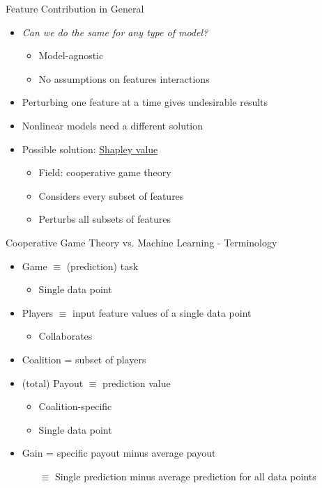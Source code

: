 \documentclass[dvipsnames]{beamer}
\begin{document}
\begin{frame}{Feature Contribution in General}
	\begin{itemize}
		\item<1-> \emph{Can we do the same for any type of model?}
		\begin{itemize}
			\item Model-agnostic
			\item No assumptions on features interactions
		\end{itemize}
		\vspace{2em}
		\item<2-> Perturbing one feature at a time gives undesirable results
		\item<2-> Nonlinear models need a different solution
		\vspace{2em}
		\item<3-> Possible solution: \underline{Shapley value}
		\begin{itemize}
			\item Field: cooperative game theory
			\item Considers every subset of features
			\item Perturbs all subsets of features
		\end{itemize}
	\end{itemize}
\end{frame}

\begin{frame}{Cooperative Game Theory vs. Machine Learning - Terminology}
	\begin{itemize}\setlength\itemsep{1.5em}
		\item<1-> Game $\equiv$ (prediction) task
		\begin{itemize}
			\item Single data point
		\end{itemize}
		\item<2-> Players $\equiv$ input feature values of a single data point
		\begin{itemize}
			\item Collaborates
		\end{itemize}
		\item<3-> Coalition = subset of players
		\item<4-> (total) Payout $\equiv$ prediction value
		\begin{itemize}
			\item Coalition-specific
			\item Single data point
		\end{itemize}
		\item<5-> Gain = specific payout minus average payout
		\begin{itemize}
			\item[$\equiv$] Single prediction minus average prediction for all data points
		\end{itemize}
	\end{itemize}
\end{frame}
\end{document}
